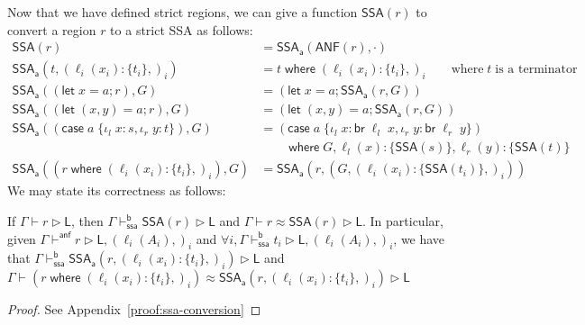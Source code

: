 \documentclass[acmsmall,screen,review]{acmart}
\newcommand{\ms}[1]{\ensuremath{\mathsf{#1}}}
\newcommand{\lto}{:}
\newcommand{\linl}[1]{\iota_l\;{#1}}
\newcommand{\linr}[1]{\iota_r\;{#1}}
\newcommand{\letstmt}[3]{\ensuremath{\ms{let}\;#1 = #2; #3}}
\newcommand{\brb}[2]{\ms{br}\;#1\;#2}
\newcommand{\casestmt}[5]{\ms{case}\;#1\;\{\linl{#2} \lto #3, \linr{#4} \lto #5\}}
\newcommand{\where}[2]{#1\;\ms{where}\;#2}
\newcommand{\wbranch}[3]{#1(#2) \lto \{#3\}}
\newcommand{\haslb}[3]{#1 \vdash #2 \rhd #3}
\newcommand{\ahaslb}[3]{#1 \vdash^{\ms{anf}} #2 \rhd #3}
\newcommand{\bhaslb}[3]{#1 \vdash^{\ms{b}}_{\ms{ssa}} #2 \rhd #3}
\newcommand{\teqv}{\approx}
\newcommand{\lbeq}[4]{#1 \vdash #2 \teqv #3 \rhd {#4}}
\newcommand{\toanf}[1]{\ms{ANF}(#1)}
\newcommand{\tossa}[1]{\ms{SSA}(#1)}
\newcommand{\ssawhere}[2]{\ms{SSA}_{\ms{a}}(#1, #2)}
\begin{document}
Now that we have defined strict regions, we can give a function $\tossa{r}$ to convert a region $r$
to a strict SSA as follows:
\begin{equation}
  \begin{aligned}
    \tossa{r} &= \ssawhere{\toanf{r}}{\cdot}
      \\
    \ssawhere{t}{(\wbranch{\ell_i}{x_i}{t_i},)_i} 
      &= \where{t}{(\wbranch{\ell_i}{x_i}{t_i},)_i} \qquad \text{where}\;t\;\text{is a terminator}
      \\
    \ssawhere{(\letstmt{x}{a}{r})}{G} &= (\letstmt{x}{a}{\ssawhere{r}{G}}) \\
    \ssawhere{(\letstmt{(x, y)}{a}{r})}{G} &= (\letstmt{(x, y)}{a}{\ssawhere{r}{G}}) \\
    \ssawhere{(\casestmt{a}{x}{s}{y}{t})}{G} &=
     \where{(\casestmt{a}{x}{\brb{\ell_l}{x}}{y}
                    {\brb{\ell_r}{y}})  \\ & \qquad }
                    {G, \wbranch{\ell_l}{x}{\tossa{s}}, \wbranch{\ell_r}{y}{\tossa{t}}} \\
    \ssawhere{(\where{r}{(\wbranch{\ell_i}{x_i}{t_i},)_i})}{G} 
      &= \ssawhere{r}{(G, (\wbranch{\ell_i}{x_i}{\tossa{t_i}},)_i)}
  \end{aligned}
\end{equation}
We may state its correctness as follows:
\begin{lemma}[name=SSA conversion, restate=ssaconversion]
  If $\haslb{\Gamma}{r}{\ms{L}}$, then $\bhaslb{\Gamma}{\tossa{r}}{\ms{L}}$ and
  $\lbeq{\Gamma}{r}{\tossa{r}}{\ms{L}}$. In particular, given $\ahaslb{\Gamma}{r}{\ms{L},
  (\ell_i(A_i),)_i}$ and $\forall i, \bhaslb{\Gamma}{t_i}{\ms{L}, (\ell_i(A_i),)_i}$, we have that
  $\bhaslb{\Gamma}{\ssawhere{r}{(\wbranch{\ell_i}{x_i}{t_i},)_i}}{\ms{L}}$ and $\lbeq{\Gamma}
  {(\where{r}{(\wbranch{\ell_i}{x_i}{t_i},)_i})  }
  {\ssawhere{r}{(\wbranch{\ell_i}{x_i}{t_i},)_i}}{\ms{L}}$
\end{lemma}
\begin{proof}
  See Appendix~\ref{proof:ssa-conversion}
\end{proof}
\end{document}
